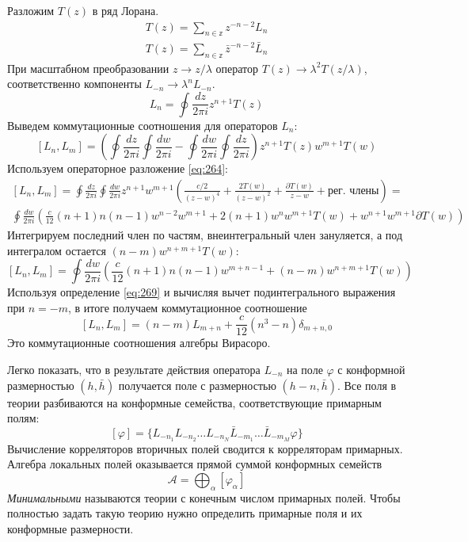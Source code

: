\documentclass[a4paper,12pt]{article}
\theoremstyle{definition}
\theoremstyle{definition}
\theoremstyle{definition}
\begin{document}
Разложим $T(z)$ в ряд Лорана.
\begin{eqnarray}
  \label{eq:268}
  T(z)=\sum_{n\in \mathbb{z}}z^{-n-2}L_{n}\\
  T(z)=\sum_{n\in \mathbb{z}}\bar z^{-n-2}\bar L_{n}
\end{eqnarray}
При масштабном преобразовании $z\to z/\lambda$ оператор $T(z)\to \lambda^{2}T(z/\lambda)$, соответственно компоненты $L_{-n}\to \lambda^{n}L_{-n}$.
\begin{equation}
  \label{eq:269}
  L_{n}=\oint \frac{dz}{2\pi i} z^{n+1} T(z)
\end{equation}
Выведем коммутационные соотношения для операторов $L_{n}$:
\begin{equation}
  \label{eq:270}
  [L_{n},L_{m}]=\left( \oint \frac{dz}{2\pi i}\oint \frac{dw}{2\pi i}-\oint \frac{dw}{2\pi i}\oint \frac{dz}{2\pi i}\right) z^{n+1} T(z)w^{m+1}T(w)
\end{equation}
Используем операторное разложение \eqref{eq:264}:
\begin{multline}
  \label{eq:271}
  [L_{n},L_{m}]=\oint \frac{dz}{2\pi i} \oint \frac{dw}{2\pi i} z^{n+1} w^{m+1}\left( \frac{c/2}{(z-w)^{4}} +\frac{2T(w)}{(z-w)^{2}}+\frac{\partial T(w) }{z-w} +\mbox{рег. члены}\right) =\\
  \oint \frac{dw}{2\pi i} \left(\frac{c}{12} (n+1)n(n-1)w^{n-2}w^{m+1} + 2(n+1)w^{n}w^{m+1}T(w)+w^{n+1}w^{m+1}\partial T(w)\right)
\end{multline}
Интегрируем последний член по частям, внеинтегральный член зануляется, а под интегралом остается $(n-m)w^{n+m+1}T(w)$:
\begin{equation}
  \label{eq:272}
    [L_{n},L_{m}]=\oint \frac{dw}{2\pi i} \left(\frac{c}{12} (n+1)n(n-1)w^{m+n-1}+ (n-m)w^{n+m+1}T(w)\right)
\end{equation}
Используя определение \eqref{eq:269} и вычисляя вычет подинтегрального выражения при $n=-m$, в итоге получаем коммутационное соотношение
\begin{equation}
  \label{eq:273}
    [L_{n},L_{m}]=(n-m)L_{m+n}+\frac{c}{12}(n^{3}-n)\delta_{m+n,0}
\end{equation}
Это коммутационные соотношения алгебры Вирасоро.

Легко показать, что в результате действия оператора $L_{-n}$ на поле $\varphi$  с конформной размерностью $(h,\bar h)$ получается поле с размерностью $(h-n,\bar h)$. Все поля в теории разбиваются на конформные семейства, соответствующие примарным полям:
\begin{equation}
  \label{eq:274}
  [\varphi]=\{L_{-n_{1}}L_{-n_{2}}\dots L_{-n_{N}}\bar L_{-m_{1}}\dots \bar L_{-m_{M}}\varphi\}
\end{equation}
Вычисление корреляторов вторичных полей сводится к корреляторам примарных. Алгебра локальных полей оказывается прямой суммой конформных семейств
\begin{equation}
  \label{eq:275}
  \mathcal{A} =\bigoplus_{\alpha}[\varphi_{\alpha}]
\end{equation}
{\it Минимальными} называются теории с конечным числом примарных полей. Чтобы полностью задать такую теорию нужно определить примарные поля и их конформные размерности.
\end{document}
